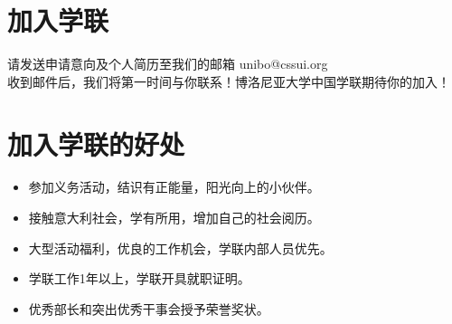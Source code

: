 
\section{加入学联}
请发送申请意向及个人简历至我们的邮箱 unibo@cssui.org\\
收到邮件后，我们将第一时间与你联系！博洛尼亚大学中国学联期待你的加入！


\section{加入学联的好处}
\begin{itemize}
\item 参加义务活动，结识有正能量，阳光向上的小伙伴。
\item 接触意大利社会，学有所用，增加自己的社会阅历。
\item 大型活动福利，优良的工作机会，学联内部人员优先。
\item 学联工作1年以上，学联开具就职证明。
\item 优秀部长和突出优秀干事会授予荣誉奖状。
\end{itemize}
